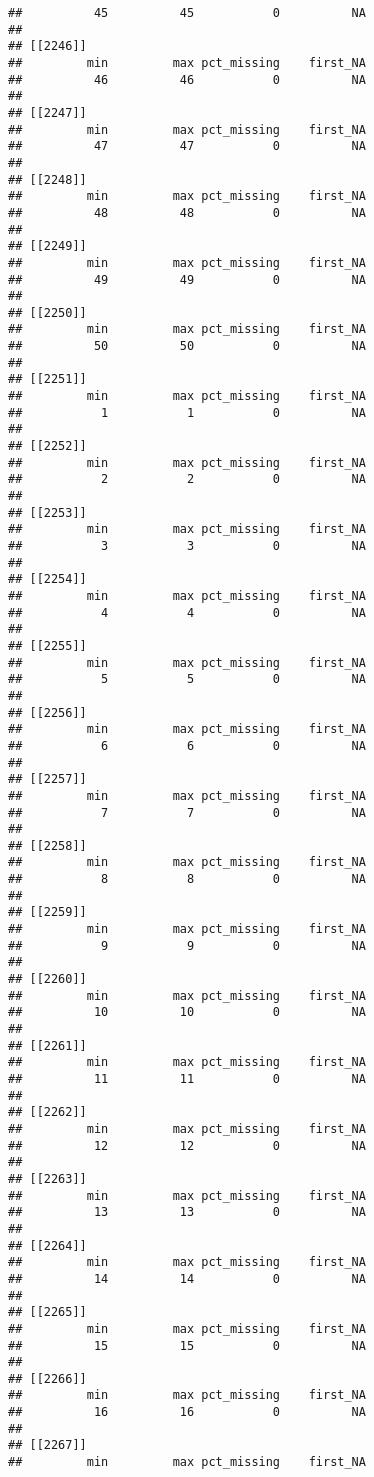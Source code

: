 \documentclass[
]{article}
\begin{document}
\begin{verbatim}
##          45          45           0          NA 
## 
## [[2246]]
##         min         max pct_missing    first_NA 
##          46          46           0          NA 
## 
## [[2247]]
##         min         max pct_missing    first_NA 
##          47          47           0          NA 
## 
## [[2248]]
##         min         max pct_missing    first_NA 
##          48          48           0          NA 
## 
## [[2249]]
##         min         max pct_missing    first_NA 
##          49          49           0          NA 
## 
## [[2250]]
##         min         max pct_missing    first_NA 
##          50          50           0          NA 
## 
## [[2251]]
##         min         max pct_missing    first_NA 
##           1           1           0          NA 
## 
## [[2252]]
##         min         max pct_missing    first_NA 
##           2           2           0          NA 
## 
## [[2253]]
##         min         max pct_missing    first_NA 
##           3           3           0          NA 
## 
## [[2254]]
##         min         max pct_missing    first_NA 
##           4           4           0          NA 
## 
## [[2255]]
##         min         max pct_missing    first_NA 
##           5           5           0          NA 
## 
## [[2256]]
##         min         max pct_missing    first_NA 
##           6           6           0          NA 
## 
## [[2257]]
##         min         max pct_missing    first_NA 
##           7           7           0          NA 
## 
## [[2258]]
##         min         max pct_missing    first_NA 
##           8           8           0          NA 
## 
## [[2259]]
##         min         max pct_missing    first_NA 
##           9           9           0          NA 
## 
## [[2260]]
##         min         max pct_missing    first_NA 
##          10          10           0          NA 
## 
## [[2261]]
##         min         max pct_missing    first_NA 
##          11          11           0          NA 
## 
## [[2262]]
##         min         max pct_missing    first_NA 
##          12          12           0          NA 
## 
## [[2263]]
##         min         max pct_missing    first_NA 
##          13          13           0          NA 
## 
## [[2264]]
##         min         max pct_missing    first_NA 
##          14          14           0          NA 
## 
## [[2265]]
##         min         max pct_missing    first_NA 
##          15          15           0          NA 
## 
## [[2266]]
##         min         max pct_missing    first_NA 
##          16          16           0          NA 
## 
## [[2267]]
##         min         max pct_missing    first_NA 

\end{verbatim}
\end{document}
